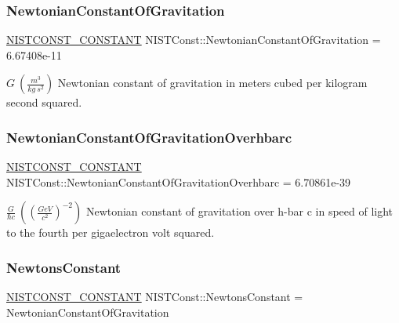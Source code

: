 \subsubsection{\texorpdfstring{Newtonian\+Constant\+Of\+Gravitation}{NewtonianConstantOfGravitation}}
{\footnotesize\ttfamily \mbox{\hyperlink{group___n_i_s_t_const-_macros_ga2b0fc1d7452373f816175dd86ce26729}{N\+I\+S\+T\+C\+O\+N\+S\+T\+\_\+\+C\+O\+N\+S\+T\+A\+NT}} N\+I\+S\+T\+Const\+::\+Newtonian\+Constant\+Of\+Gravitation = 6.\+67408e-\/11}

$G \ (\frac{m^3}{kg\ s^2})$ Newtonian constant of gravitation in meters cubed per kilogram second squared. \mbox{\label{group___n_i_s_t_const-_gravitational_constant_gaab8e9e8695add729258bef9e2fc7e9bf}} 
\subsubsection{\texorpdfstring{Newtonian\+Constant\+Of\+Gravitation\+Overhbarc}{NewtonianConstantOfGravitationOverhbarc}}
{\footnotesize\ttfamily \mbox{\hyperlink{group___n_i_s_t_const-_macros_ga2b0fc1d7452373f816175dd86ce26729}{N\+I\+S\+T\+C\+O\+N\+S\+T\+\_\+\+C\+O\+N\+S\+T\+A\+NT}} N\+I\+S\+T\+Const\+::\+Newtonian\+Constant\+Of\+Gravitation\+Overhbarc = 6.\+70861e-\/39}

$\frac{G}{\hbar c} \ ((\frac{GeV}{c^2})^{-2})$ Newtonian constant of gravitation over h-\/bar c in speed of light to the fourth per gigaelectron volt squared. \mbox{\label{group___n_i_s_t_const-_gravitational_constant_gae40947c8bfb3aa0da4a156bdfbe8dd34}} 
\subsubsection{\texorpdfstring{Newtons\+Constant}{NewtonsConstant}}
{\footnotesize\ttfamily \mbox{\hyperlink{group___n_i_s_t_const-_macros_ga2b0fc1d7452373f816175dd86ce26729}{N\+I\+S\+T\+C\+O\+N\+S\+T\+\_\+\+C\+O\+N\+S\+T\+A\+NT}} N\+I\+S\+T\+Const\+::\+Newtons\+Constant = Newtonian\+Constant\+Of\+Gravitation}

